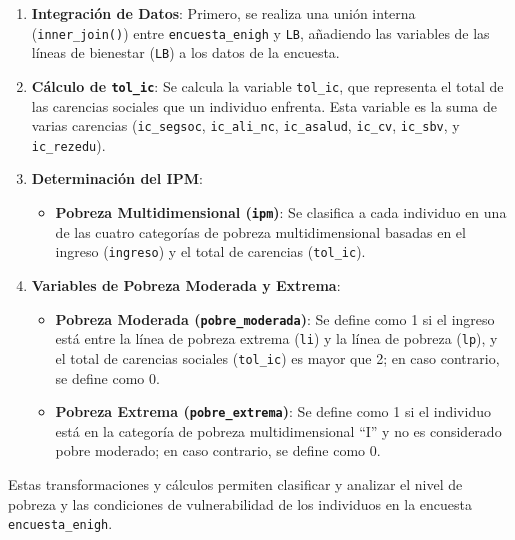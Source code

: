 \documentclass[
  12pt,
]{book}
\providecommand{\tightlist}{%
  \setlength{\itemsep}{0pt}\setlength{\parskip}{0pt}}
\begin{document}
\begin{enumerate}
\def\labelenumi{\arabic{enumi}.}
\item
  \textbf{Integración de Datos}: Primero, se realiza una unión interna (\texttt{inner\_join()}) entre \texttt{encuesta\_enigh} y \texttt{LB}, añadiendo las variables de las líneas de bienestar (\texttt{LB}) a los datos de la encuesta.
\item
  \textbf{Cálculo de \texttt{tol\_ic}}: Se calcula la variable \texttt{tol\_ic}, que representa el total de las carencias sociales que un individuo enfrenta. Esta variable es la suma de varias carencias (\texttt{ic\_segsoc}, \texttt{ic\_ali\_nc}, \texttt{ic\_asalud}, \texttt{ic\_cv}, \texttt{ic\_sbv}, y \texttt{ic\_rezedu}).
\item
  \textbf{Determinación del IPM}:

  \begin{itemize}
  \tightlist
  \item
    \textbf{Pobreza Multidimensional (\texttt{ipm})}: Se clasifica a cada individuo en una de las cuatro categorías de pobreza multidimensional basadas en el ingreso (\texttt{ingreso}) y el total de carencias (\texttt{tol\_ic}).
  \end{itemize}
\item
  \textbf{Variables de Pobreza Moderada y Extrema}:

  \begin{itemize}
  \tightlist
  \item
    \textbf{Pobreza Moderada (\texttt{pobre\_moderada})}: Se define como 1 si el ingreso está entre la línea de pobreza extrema (\texttt{li}) y la línea de pobreza (\texttt{lp}), y el total de carencias sociales (\texttt{tol\_ic}) es mayor que 2; en caso contrario, se define como 0.
  \item
    \textbf{Pobreza Extrema (\texttt{pobre\_extrema})}: Se define como 1 si el individuo está en la categoría de pobreza multidimensional ``I'' y no es considerado pobre moderado; en caso contrario, se define como 0.
  \end{itemize}
\end{enumerate}

Estas transformaciones y cálculos permiten clasificar y analizar el nivel de pobreza y las condiciones de vulnerabilidad de los individuos en la encuesta \texttt{encuesta\_enigh}.
\end{document}
